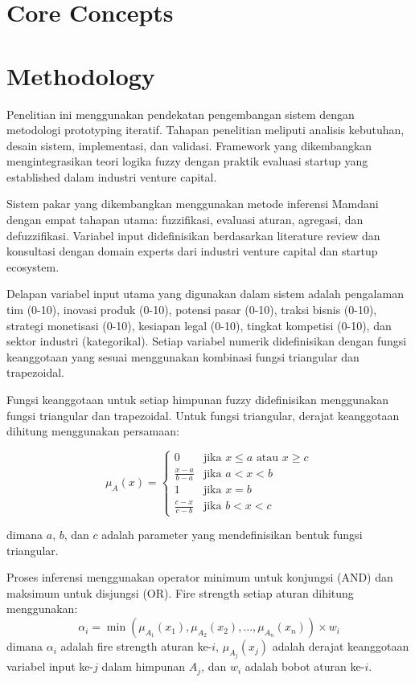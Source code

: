 \documentclass{article}
\begin{document}
\section{Core Concepts}

\section{Methodology}

Penelitian ini menggunakan pendekatan pengembangan sistem dengan metodologi prototyping iteratif. Tahapan penelitian meliputi analisis kebutuhan, desain sistem, implementasi, dan validasi. Framework yang dikembangkan mengintegrasikan teori logika fuzzy dengan praktik evaluasi startup yang established dalam industri venture capital.

Sistem pakar yang dikembangkan menggunakan metode inferensi Mamdani dengan empat tahapan utama: fuzzifikasi, evaluasi aturan, agregasi, dan defuzzifikasi. Variabel input didefinisikan berdasarkan literature review dan konsultasi dengan domain experts dari industri venture capital dan startup ecosystem.

Delapan variabel input utama yang digunakan dalam sistem adalah pengalaman tim (0-10), inovasi produk (0-10), potensi pasar (0-10), traksi bisnis (0-10), strategi monetisasi (0-10), kesiapan legal (0-10), tingkat kompetisi (0-10), dan sektor industri (kategorikal). Setiap variabel numerik didefinisikan dengan fungsi keanggotaan yang sesuai menggunakan kombinasi fungsi triangular dan trapezoidal.

Fungsi keanggotaan untuk setiap himpunan fuzzy didefinisikan menggunakan fungsi triangular dan trapezoidal. Untuk fungsi triangular, derajat keanggotaan dihitung menggunakan persamaan:

\begin{equation}
\mu_A(x) = \begin{cases}
0 & \text{jika } x \leq a \text{ atau } x \geq c \\
\frac{x-a}{b-a} & \text{jika } a < x < b \\
1 & \text{jika } x = b \\
\frac{c-x}{c-b} & \text{jika } b < x < c
\end{cases}
\end{equation}

dimana $a$, $b$, dan $c$ adalah parameter yang mendefinisikan bentuk fungsi triangular.

Proses inferensi menggunakan operator minimum untuk konjungsi (AND) dan maksimum untuk disjungsi (OR). Fire strength setiap aturan dihitung menggunakan:
\begin{equation}
\alpha_i = \min(\mu_{A_1}(x_1), \mu_{A_2}(x_2), \dots, \mu_{A_n}(x_n)) \times w_i
\end{equation}
dimana $\alpha_i$ adalah fire strength aturan ke-$i$, $\mu_{A_j}(x_j)$ adalah derajat keanggotaan variabel input ke-$j$ dalam himpunan $A_j$, dan $w_i$ adalah bobot aturan ke-$i$.
\end{document}
